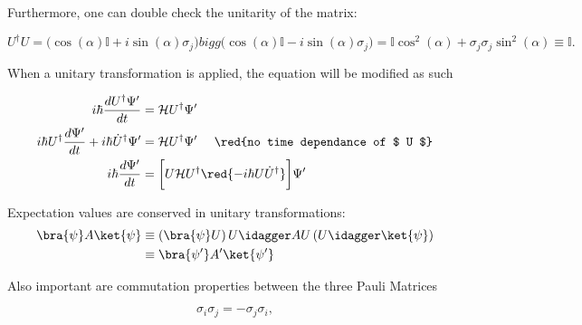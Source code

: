  \noindent  Furthermore,  one can  double  check  the unitarity  of  the
 matrix:

 \begin{equation}\label{uniunitary}
   U^{\dagger}U =\bigg( \cos(\alpha)\mathbb{I}+i\sin(\alpha)\sigma_j\bigg)bigg( \cos(\alpha)\mathbb{I}-i\sin(\alpha)\sigma_j\bigg) = \mathbb{I}\cos^2(\alpha)+\sigma_j\sigma_j\sin^2(\alpha)\equiv\mathbb{I}.
 \end{equation}

 \noindent         When         a         unitary         transformation
   is
 applied, the \schrodinger equation will be modified as such

 \begin{equation}\label{duninewschroer}
   \begin{aligned}
     i\hbar\frac{dU^{\dagger}\Psi'}{dt} & = \mathcal{H}U^{\dagger}\Psi'\\
     i\hbar{U}^{\dagger}\frac{d\Psi'}{dt} + i\hbar\dot{U}^{\dagger}{\Psi'} & = \mathcal{H}U^{\dagger}\Psi' \quad\text{ \red{no time dependance of $ U $}}\\
     i\hbar\frac{d\Psi'}{dt} & = \bigg[U\mathcal{H}U^{\dagger} \red{-i\hbar U\dot{U}^{\dagger}}\bigg]\Psi'\\
   \end{aligned}
 \end{equation}

\begin{framed}\noindent
  Expectation values are conserved in unitary transformations:
  \[
    \begin{aligned}
      \bra{\psi}A\ket{\psi} & \equiv \left(\bra{\psi}U\right)U\idagger AU\left(U\idagger\ket{\psi}\right)\\
      & \equiv \bra{\psi'}A'\ket{\psi'}
    \end{aligned}
  \]
\end{framed}

\noindent Also  important are  commutation properties between  the three
Pauli Matrices

 \begin{equation}\label{uniComm}
   \sigma_i\sigma_j=-\sigma_j\sigma_i,
 \end{equation}

